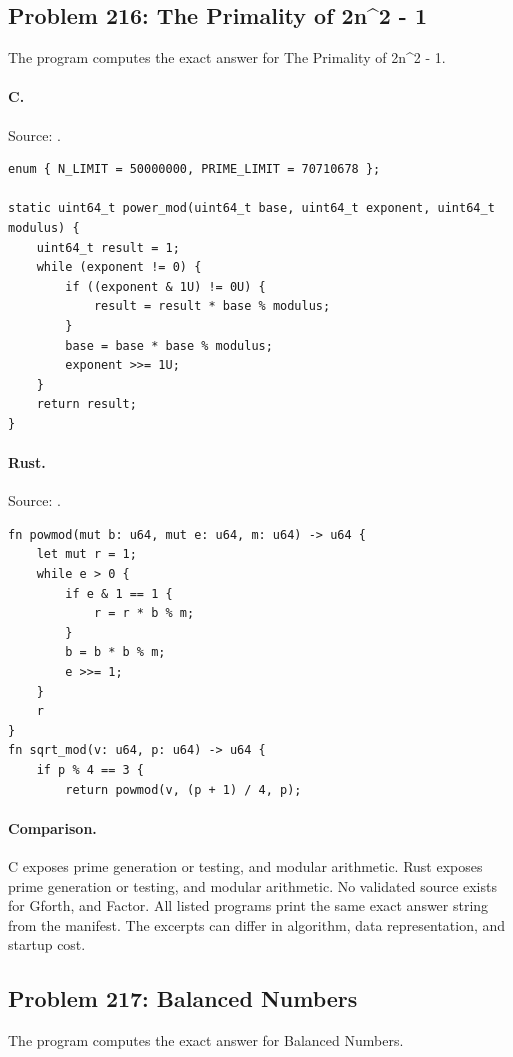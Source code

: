 \subsection{Problem 216: The Primality of 2n\textasciicircum{}2 - 1}
\label{walkthrough:p216}
The program computes the exact answer for The Primality of 2n\textasciicircum{}2 - 1.

\paragraph{C.} Source: .
\begin{lstlisting}
enum { N_LIMIT = 50000000, PRIME_LIMIT = 70710678 };

static uint64_t power_mod(uint64_t base, uint64_t exponent, uint64_t modulus) {
    uint64_t result = 1;
    while (exponent != 0) {
        if ((exponent & 1U) != 0U) {
            result = result * base % modulus;
        }
        base = base * base % modulus;
        exponent >>= 1U;
    }
    return result;
}
\end{lstlisting}

\paragraph{Rust.} Source: .
\begin{lstlisting}
fn powmod(mut b: u64, mut e: u64, m: u64) -> u64 {
    let mut r = 1;
    while e > 0 {
        if e & 1 == 1 {
            r = r * b % m;
        }
        b = b * b % m;
        e >>= 1;
    }
    r
}
fn sqrt_mod(v: u64, p: u64) -> u64 {
    if p % 4 == 3 {
        return powmod(v, (p + 1) / 4, p);
\end{lstlisting}

\paragraph{Comparison.}
C exposes prime generation or testing, and modular arithmetic. Rust exposes prime generation or testing, and modular arithmetic.
No validated source exists for Gforth, and Factor.
All listed programs print the same exact answer string from the manifest. The excerpts can differ in algorithm, data representation, and startup cost.

\subsection{Problem 217: Balanced Numbers}
\label{walkthrough:p217}
The program computes the exact answer for Balanced Numbers.

